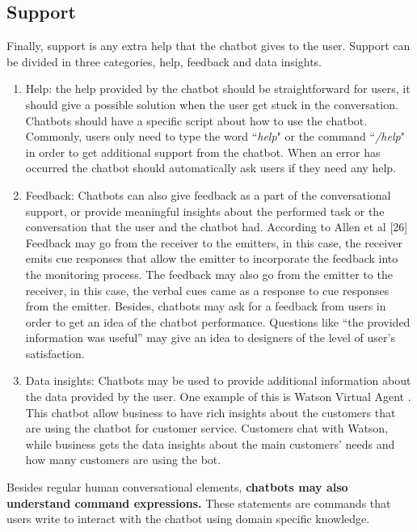\documentclass[a4paper,10pt]{article}
\begin{document}
\subsection{Support}
Finally, support is any extra help that the chatbot gives to the user. Support can be divided in three categories, help, feedback and data insights.
\begin{enumerate}
\item Help: the help provided by the chatbot should be straightforward for users, it should give a possible solution when the user get stuck in the conversation. Chatbots should have a specific script about how to use the chatbot. Commonly, users only need to type the word ``\textit{help}" or the command ``\textit{/help}" in order to get additional support from the chatbot. When an error has occurred the chatbot should automatically ask users if they need any help. 

\item Feedback: Chatbots can also give feedback as a part of the conversational support, or provide meaningful insights about the performed task or the conversation that the user and the chatbot had. According to Allen et al [26] Feedback may go from the receiver to the emitters, in this case, the receiver emits cue responses that allow the emitter to incorporate the feedback into the monitoring process. The feedback may also go from the emitter to the receiver, in this case, the verbal cues came as a response to cue responses from the emitter. 
Besides, chatbots may ask for a feedback from users in order to get an idea of the chatbot performance. Questions like “the provided information was useful” may give an idea to designers of the level of user’s satisfaction. 

\item Data insights: Chatbots may be used to provide additional information about the data provided by the user. One example of this is Watson Virtual Agent \cite{SuzorCustomerAnalytics}. This chatbot allow business to have rich insights about the customers that are using the chatbot for customer service. Customers chat with Watson, while business gets the data insights about the main customers’ needs and how many customers are using the bot. 
\end{enumerate}


Besides regular human conversational elements, \textbf{chatbots may also understand command expressions.} These statements are commands that users write to interact with the chatbot using domain specific knowledge. 
\end{document}
